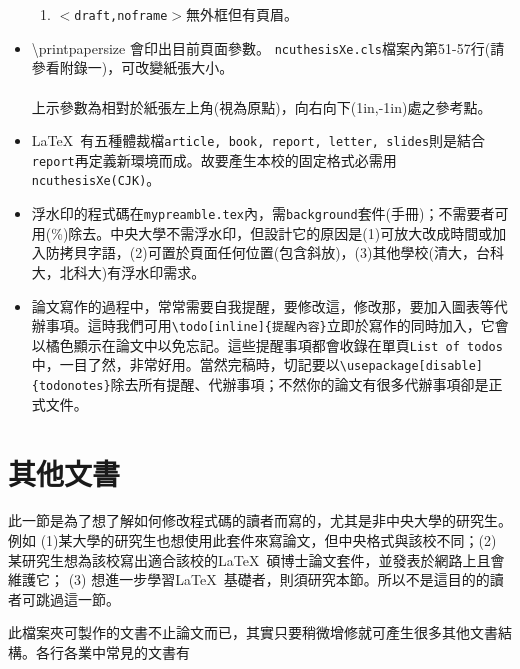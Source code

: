 \begin{itemize}
\begin{enumerate}
\item$<${\tt draft,noframe}$>$無外框但有頁眉。
\end{enumerate}
\item \textbackslash printpapersize 會印出目前頁面參數。
{\tt ncuthesisXe.cls}檔案內第51-57行(請參看附錄一)，可改變紙張大小。\\
\framebox{
\printpagesize 
}\\               %
上示參數為相對於紙張左上角(視為原點)，向右向下(1in,-1in)處之參考點。
\item \LaTeX\ 有五種體裁檔{\tt article, book, report, letter, slides}\hfil{}則是結合{\tt report}再定義新環境而成。故要產生本校的固定格式必需用{\tt ncuthesisXe(CJK)}。
\item 浮水印的程式碼在{\tt mypreamble.tex}內，需{\tt background}套件(手冊)；不需要者可用(\%)除去。中央大學不需浮水印，但設計它的原因是(1)可放大改成時間或加入防拷貝字語，(2)可置於頁面任何位置(包含斜放)，(3)其他學校(清大，台科大，北科大)有浮水印需求。
\item 論文寫作的過程中，常常需要自我提醒，要修改這，修改那，要加入圖表等代辦事項。這時我們可用\verb|\todo[inline]{提醒內容}|立即於寫作的同時加入，它會以橘色顯示在論文中以免忘記。這些提醒事項都會收錄在單頁{\tt List of todos}中，一目了然，非常好用。當然完稿時，切記要以{\tt \textbackslash usepackage[disable]\{todonotes\}}除去所有提醒、代辦事項；不然你的論文有很多代辦事項卻是正式文件。
\end{itemize}

\section{其他文書\label{others}}

此一節是為了想了解如何修改程式碼的讀者而寫的，尤其是非中央大學的研究生。例如 (1)某大學的研究生也想使用此套件來寫論文，但中央格式與該校不同；(2) 某研究生想為該校寫出適合該校的\LaTeX\ 碩博士論文套件，並發表於網路上且會維護它； (3) 想進一步學習\LaTeX\ 基礎者，則須研究本節。所以不是這目的的讀者可跳過這一節。

此檔案夾可製作的文書不止論文而已，其實只要稍微增修就可產生很多其他文書結構。各行各業中常見的文書有

